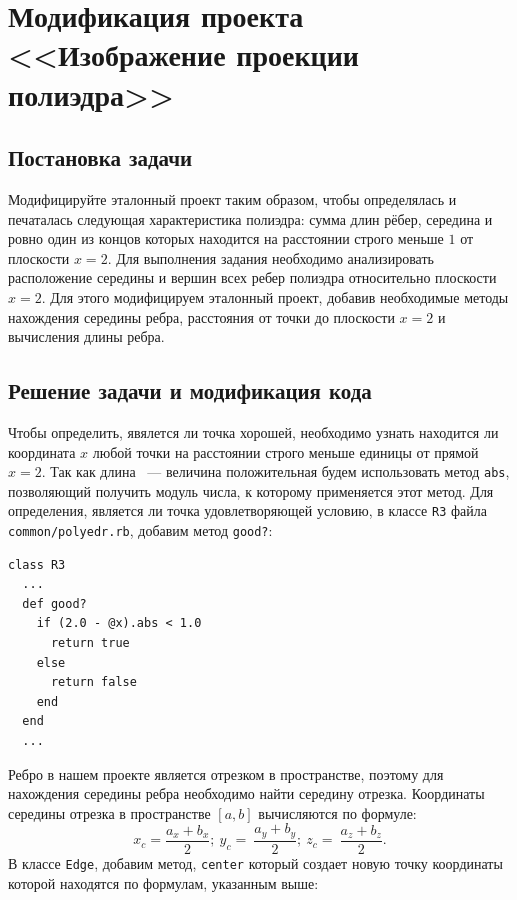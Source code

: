\section{Модификация проекта <<Изображение проекции полиэдра>>}

\subsection{Постановка задачи}

Модифицируйте эталонный проект таким образом, чтобы определялась и печаталась следующая характеристика полиэдра: сумма длин рёбер, середина и ровно один из концов которых находится на расстоянии строго меньше $1$ от плоскости $x=2$. 
Для выполнения задания необходимо анализировать расположение середины и вершин всех ребер полиэдра относительно плоскости $x=2$. Для этого модифицируем эталонный проект, добавив необходимые методы нахождения середины ребра, расстояния от точки до плоскости $x=2$ и вычисления длины ребра.

\subsection{Решение задачи и модификация кода}
Чтобы определить, явялется ли точка хорошей, необходимо узнать находится ли координата $\mathit x$ любой точки на расстоянии строго меньше единицы от прямой $x=2$. Так как длина ~--- величина положительная будем использовать метод \texttt{abs}, позволяющий получить модуль числа, к которому применяется этот метод. Для определения, является ли точка удовлетворяющей условию, в классе \texttt{R3} файла \texttt{common/polyedr.rb}, добавим метод \texttt{good?}: 

\begin{small}
\begin{verbatim}
class R3
  ...
  def good?
    if (2.0 - @x).abs < 1.0 
      return true
    else
      return false
    end 
  end
  ...
\end{verbatim}
\end{small}

Ребро в нашем проекте является отрезком в пространстве, поэтому для нахождения середины ребра необходимо найти середину отрезка. Координаты середины отрезка в пространстве $[ \mathit a, \mathit b ]$ вычисляются по формуле:
$$x_{c}=\frac{a_{x}+b_{x}}{2};~y_{c}=~\frac{a_{y}+b_{y}}{2};~z_{c}=~ \frac{a_{z}+b_{z}}{2}.$$
В классе \texttt{Edge}, добавим метод, \texttt{center} который создает новую точку координаты которой находятся по формулам, указанным выше:

